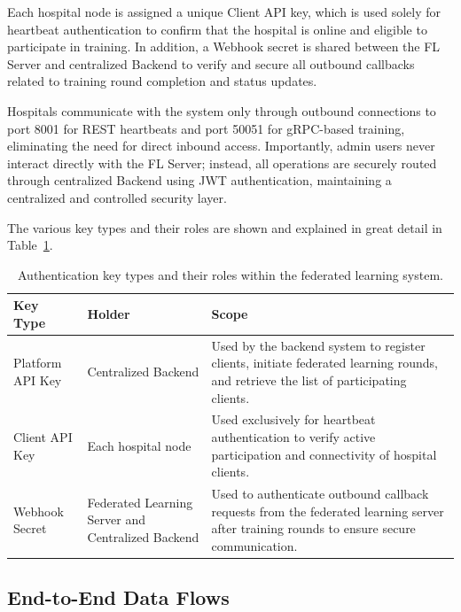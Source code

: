 Each hospital node is assigned a unique Client API key, which is used solely for heartbeat authentication to confirm that the hospital is online and eligible to participate in training. In addition, a Webhook secret is shared between the FL Server and centralized  Backend to verify and secure all outbound callbacks related to training round completion and status updates.

Hospitals communicate with the system only through outbound connections to port 8001 for REST heartbeats and port 50051 for gRPC-based training, eliminating the need for direct inbound access. Importantly, admin users never interact directly with the FL Server; instead, all operations are securely routed through centralized Backend using JWT authentication, maintaining a centralized and controlled security layer.

The various key types and their roles are shown and explained in great detail in Table~\ref{tab:fl_keys}.

\begin{table}[htbp]
	\centering
	\caption{Authentication key types and their roles within the federated learning system.}
	\label{tab:fl_keys}
	\begin{tabular}{|p{4cm}|p{4.5cm}|p{6cm}|}
		\hline
		\textbf{Key Type} & \textbf{Holder} & \textbf{Scope} \\
		\hline
		
		Platform API Key &
		Centralized Backend &
		Used by the backend system to register clients, initiate federated learning rounds, and retrieve the list of participating clients. \\
		\hline
		
		Client API Key &
		Each hospital node &
		Used exclusively for heartbeat authentication to verify active participation and connectivity of hospital clients. \\
		\hline
		
		Webhook Secret &
		Federated Learning Server and Centralized Backend &
		Used to authenticate outbound callback requests from the federated learning server after training rounds to ensure secure communication. \\
		\hline
		
	\end{tabular}
\end{table}

\subsection{End-to-End Data Flows}
